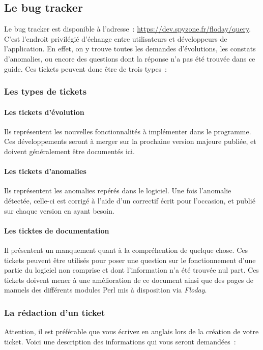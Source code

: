 \subsection{Le bug tracker}
\label{sec:contribution_bt}

Le bug tracker est disponible à l'adresse~: \url{https://dev.spyzone.fr/floday/query}.
C'est l'endroit privilégié d'échange entre utilisateurs et développeurs de l'application.
En effet, on y trouve toutes les demandes d'évolutions, les constats d'anomalies, ou encore des questions dont la réponse n'a pas été trouvée dans ce guide.
Ces tickets peuvent donc être de trois types~:

\subsubsection{Les types de tickets}
\paragraph{Les tickets d'évolution} Ils représentent les nouvelles fonctionnalités à implémenter dans le programme. Ces développements seront à merger sur la prochaine version majeure publiée, et doivent généralement être documentés ici.
\paragraph{Les tickets d'anomalies} Ils représentent les anomalies repérés dans le logiciel. Une fois l'anomalie détectée, celle-ci est corrigé à l'aide d'un correctif écrit pour l'occasion, et publié sur chaque version en ayant besoin.
\paragraph{Les ticktes de documentation} Il présentent un manquement quant à la compréhention de quelque chose. Ces tickets peuvent être utilisés pour poser une question sur le fonctionnement d'une partie du logiciel non comprise et dont l'information n'a été trouvée nul part. Ces tickets doivent mener à une amélioration de ce document ainsi que des pages de manuels des différents modules Perl mis à disposition via \emph{Floday}.

\subsubsection{La rédaction d'un ticket}
Attention, il est préférable que vous écrivez en anglais lors de la création de votre ticket.
Voici une description des informations qui vous seront demandées~:
\newline

